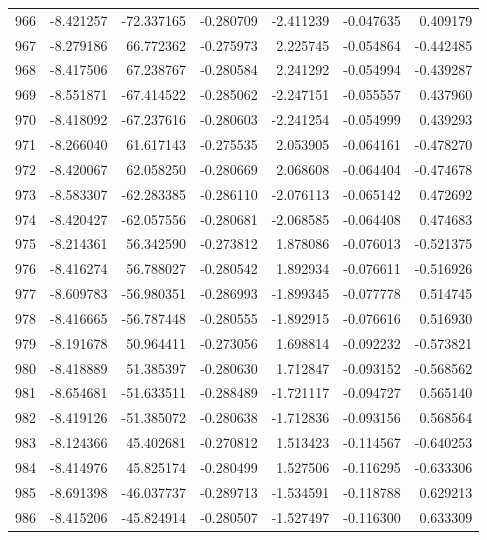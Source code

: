 \begin{tabular}{rrrrrrr}
 966 &  -8.421257 &  -72.337165 & -0.280709 &  -2.411239 &  -0.047635 &  0.409179 \\
 967 &  -8.279186 &   66.772362 & -0.275973 &   2.225745 &  -0.054864 & -0.442485 \\
 968 &  -8.417506 &   67.238767 & -0.280584 &   2.241292 &  -0.054994 & -0.439287 \\
 969 &  -8.551871 &  -67.414522 & -0.285062 &  -2.247151 &  -0.055557 &  0.437960 \\
 970 &  -8.418092 &  -67.237616 & -0.280603 &  -2.241254 &  -0.054999 &  0.439293 \\
 971 &  -8.266040 &   61.617143 & -0.275535 &   2.053905 &  -0.064161 & -0.478270 \\
 972 &  -8.420067 &   62.058250 & -0.280669 &   2.068608 &  -0.064404 & -0.474678 \\
 973 &  -8.583307 &  -62.283385 & -0.286110 &  -2.076113 &  -0.065142 &  0.472692 \\
 974 &  -8.420427 &  -62.057556 & -0.280681 &  -2.068585 &  -0.064408 &  0.474683 \\
 975 &  -8.214361 &   56.342590 & -0.273812 &   1.878086 &  -0.076013 & -0.521375 \\
 976 &  -8.416274 &   56.788027 & -0.280542 &   1.892934 &  -0.076611 & -0.516926 \\
 977 &  -8.609783 &  -56.980351 & -0.286993 &  -1.899345 &  -0.077778 &  0.514745 \\
 978 &  -8.416665 &  -56.787448 & -0.280555 &  -1.892915 &  -0.076616 &  0.516930 \\
 979 &  -8.191678 &   50.964411 & -0.273056 &   1.698814 &  -0.092232 & -0.573821 \\
 980 &  -8.418889 &   51.385397 & -0.280630 &   1.712847 &  -0.093152 & -0.568562 \\
 981 &  -8.654681 &  -51.633511 & -0.288489 &  -1.721117 &  -0.094727 &  0.565140 \\
 982 &  -8.419126 &  -51.385072 & -0.280638 &  -1.712836 &  -0.093156 &  0.568564 \\
 983 &  -8.124366 &   45.402681 & -0.270812 &   1.513423 &  -0.114567 & -0.640253 \\
 984 &  -8.414976 &   45.825174 & -0.280499 &   1.527506 &  -0.116295 & -0.633306 \\
 985 &  -8.691398 &  -46.037737 & -0.289713 &  -1.534591 &  -0.118788 &  0.629213 \\
 986 &  -8.415206 &  -45.824914 & -0.280507 &  -1.527497 &  -0.116300 &  0.633309 \\

\end{tabular}
